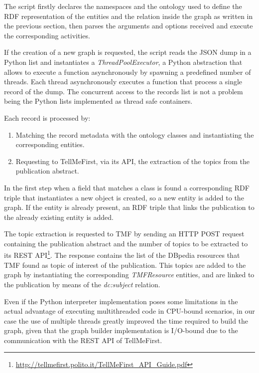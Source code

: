 \documentclass[%
    corpo=13.5pt,
    twoside,
    oldstyle,
    tipotesi=magistrale,
    greek,
    evenboxes
]{toptesi}
\begin{document}
The script firstly declares the namespaces and the ontology used to define the
RDF representation of the entities and the relation inside the graph as written
in the previous section, then parses the arguments and options received and
execute the corresponding activities.

If the creation of a new graph is requested, the script reads the JSON dump
in a Python list and instantiates a \emph{ThreadPoolExecutor}, a Python
abstraction that allows to execute a function asynchronously by spawning
a predefined number of threads.
Each thread asynchronously executes a function that process a single record of
the dump.
The concurrent access to the records list is not a problem being the Python
lists implemented as thread safe containers.

Each record is processed by:

\begin{enumerate}
    \item Matching the record metadata with the ontology classes and
        instantiating the corresponding entities.
    \item Requesting to TellMeFirst, via its API, the extraction of the topics
        from the publication abstract.
\end{enumerate}

In the first step when a field that matches a class is found a corresponding
RDF triple that instantiates a new object is created, so a new entity is added
to the graph. If the entity is already present, an RDF triple that links the
publication to the already existing entity is added.

The topic extraction is requested to TMF by sending an HTTP POST request
containing the publication abstract and the number of topics to be extracted
to its REST API\footnote{\url{http://tellmefirst.polito.it/TellMeFirst_API_Guide.pdf}}.
The response contains the list of the DBpedia resources that TMF
found as topic of interest of the publication. This topics are added to the
graph by instantiating the corresponding \emph{TMFResource} entities, and are
linked to the publication by means of the \emph{dc:subject} relation.

Even if the Python interpreter implementation poses some limitations in the
actual advantage of executing multithreaded code in CPU-bound scenarios, in our
case the use of multiple threads greatly improved the time required to build
the graph, given that the graph builder implementation is I/O-bound due to
the communication with the REST API of TellMeFirst.
\end{document}
